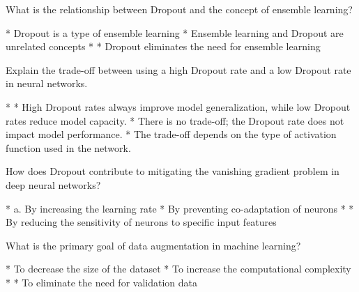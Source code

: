 \documentclass[10pt]{extarticle}
\begin{document}
\begin{exercise}
    What is the relationship between Dropout and the concept of ensemble learning?
    \begin{choice}
        * Dropout is a type of ensemble learning
        * Ensemble learning and Dropout are unrelated concepts
        * 
        * Dropout eliminates the need for ensemble learning
    \end{choice}
\end{exercise}
\begin{solution}
\end{solution}

\begin{exercise}
    Explain the trade-off between using a high Dropout rate and a low Dropout rate in neural networks.
    \begin{choice}
        * 
        * High Dropout rates always improve model generalization, while low Dropout rates reduce model capacity.
        * There is no trade-off; the Dropout rate does not impact model performance.
        * The trade-off depends on the type of activation function used in the network.
    \end{choice}
\end{exercise}
\begin{solution}
\end{solution}

\begin{exercise}
    How does Dropout contribute to mitigating the vanishing gradient problem in deep neural networks?
    \begin{choice}
        * a. By increasing the learning rate
        * By preventing co-adaptation of neurons
        * 
        * By reducing the sensitivity of neurons to specific input features
    \end{choice}
\end{exercise}
\begin{solution}
\end{solution}

\begin{exercise}
    What is the primary goal of data augmentation in machine learning?
    \begin{choice}
        * To decrease the size of the dataset
        * To increase the computational complexity
        * 
        * To eliminate the need for validation data
    \end{choice}
\end{exercise}
\begin{solution}
\end{solution}
\end{document}
